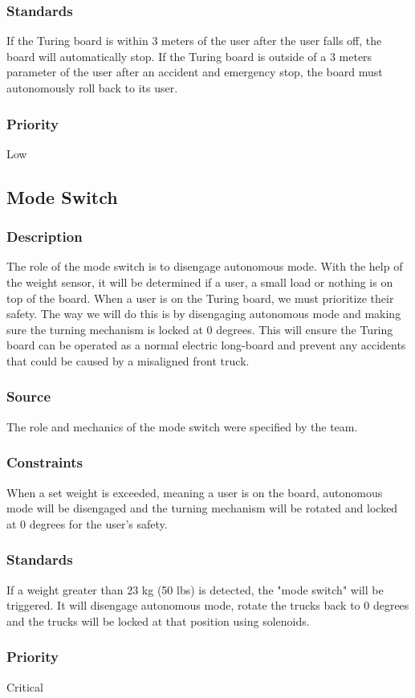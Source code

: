 \subsubsection{Standards}
If the Turing board is within 3 meters of the user after the user falls off, the board will automatically stop.\hfill \break
If the Turing board is outside of a 3 meters parameter of the user after an accident and emergency stop, the board must autonomously roll back to its user. 
\subsubsection{Priority}
Low

\subsection{Mode Switch}
\subsubsection{Description}
The role of the mode switch is to disengage autonomous mode. With the help of the weight sensor, it will be determined if a user, a small load or nothing is on top of the board. When a user is on the Turing board, we must prioritize their safety. The way we will do this is by disengaging autonomous mode and making sure the turning mechanism is locked at 0 degrees. This will ensure the Turing board can be operated as a normal electric long-board and prevent any accidents that could be caused by a misaligned front truck. 
\subsubsection{Source}
The role and mechanics of the mode switch were specified by the team.
\subsubsection{Constraints}
When a set weight is exceeded, meaning a user is on the board, autonomous mode will be disengaged and the turning mechanism will be rotated and locked at 0 degrees for the user's safety.
\subsubsection{Standards}
If a weight greater than 23 kg (50 lbs) is detected, the "mode switch" will be triggered. It will disengage autonomous mode, rotate the trucks back to 0 degrees and the trucks will be locked at that position using solenoids.
\subsubsection{Priority}
Critical
